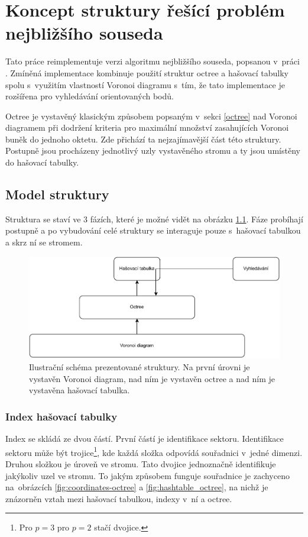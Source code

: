 \chapter{Koncept struktury řešící problém nejbližšího souseda}
\label{koncept}

Tato práce reimplementuje verzi algoritmu nejbližšího souseda, popsanou v~práci  \cite{octreehash}. Zmíněná implementace kombinuje použití struktur octree a hašovací tabulky spolu s~využitím vlastností Voronoi diagramu s~tím, že tato implementace je rozšířena pro vyhledávání orientovaných bodů.

Octree je vystavěný klasickým způsobem popsaným v~sekci \ref{octree} nad Voronoi diagramem při dodržení kriteria pro maximální množství zasahujících Voronoi buněk do jednoho oktetu. Zde přichází ta nejzajímavější část této struktury. Postupně jsou procházeny jednotlivý uzly vystavěného stromu a ty jsou umístěny do hašovací tabulky.
\section{Model struktury}
Struktura se staví ve 3 fázích, které je možné vidět na obrázku \ref{fig:struct-model}. Fáze probíhají postupně a po vybudování celé struktury se interaguje pouze s~hašovací tabulkou a skrz ní se stromem.

\begin{figure}
    \centering
    \includegraphics[scale=0.5]{obrazky-figures/octree/structu_diagram.pdf}
    \caption{Ilustrační schéma prezentované struktury. Na první úrovni je vystavěn Voronoi diagram, nad ním je vystavěn octree a nad ním je vystavěna hašovací tabulka. }
    \label{fig:struct-model}
\end{figure}

\subsection*{Index hašovací tabulky}
Index se skládá ze dvou částí. První částí je identifikace sektoru. Identifikace sektoru může být trojice\footnote{Pro $p=3$ pro $p=2$ stačí dvojice.}, kde každá složka odpovídá souřadnici v~jedné dimenzi. Druhou složkou je úroveň ve stromu. Tato dvojice jednoznačně identifikuje jakýkoliv uzel ve stromu. To jakým způsobem funguje souřadnice je zachyceno na~obrázcích \ref{fig:coordinates-octree} a \ref{fig:hashtable_octree}, na nichž je znázorněn vztah mezi hašovací tabulkou, indexy v~ní a octree.

